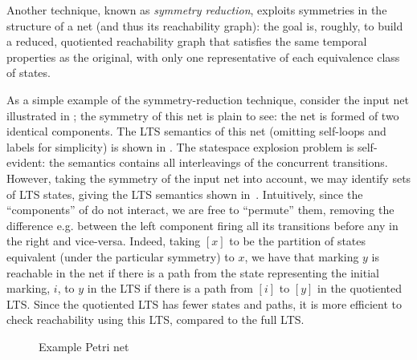 \label{sec:symmetryreduction}
Another technique, known as \emph{symmetry reduction}, exploits symmetries in
the structure of a net (and thus its reachability graph): the goal is, roughly,
to build a reduced, quotiented reachability graph that satisfies the same
temporal properties as the original, with only one representative of each
equivalence class of states.

As a simple example of the symmetry-reduction technique, consider the input net
illustrated in ; the symmetry of this net is plain to
see: the net is formed of two identical components. The LTS semantics of this
net (omitting self-loops and labels for simplicity) is shown in
. The statespace explosion problem is
self-evident: the semantics contains all interleavings of the concurrent
transitions. However, taking the symmetry of the input net into account, we may
identify sets of LTS states, giving the LTS semantics shown
in~. Intuitively, since the ``components''
of  do not interact, we are free to ``permute'' them,
removing the difference e.g. between the left component firing all its
transitions before any in the right and vice-versa. Indeed, taking $[x]$ to be
the partition of states equivalent (under the particular symmetry) to $x$, we
have that marking $y$ is reachable in the net if there is a path from the state
representing the initial marking, $i$, to $y$ in the LTS if there is a path
from $[i]$ to $[y]$ in the quotiented LTS. Since the quotiented LTS has fewer
states and paths, it is more efficient to check reachability using this LTS,
compared to the full LTS.

\begin{figure}[ht]
\centering
{}
\caption{Example Petri net}
\label{fig:exampleNet}
\end{figure}

